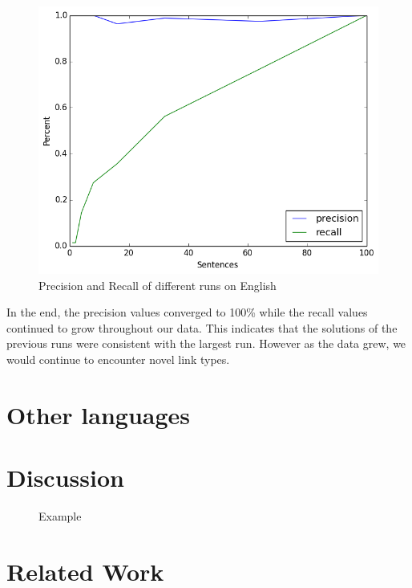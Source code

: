 \documentclass[11pt]{article}
\begin{document}
\begin{figure}[ht!]
  \centering
  \includegraphics[width=\linewidth, keepaspectratio=true]{figure/precision_recall.png}
  \caption{Precision and Recall of different runs on English}
\end{figure}

In the end, the precision values converged to 100\% while the recall values continued to grow throughout our data. This indicates that the solutions of the previous runs were consistent with the largest run. However as the data grew, we would continue to encounter novel link types.



\section{Other languages}






\section{Discussion}


\begin{figure}[ht!]
  \centering
  
  \caption{Example}
\end{figure}



\section{Related Work}







\end{document}
